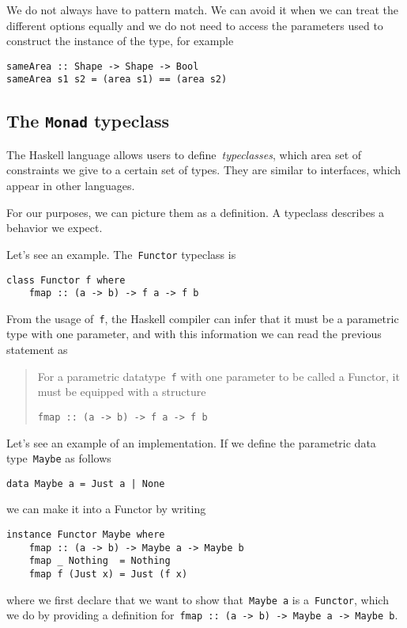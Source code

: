 \documentclass[a4paper]{article}
\theoremstyle{plain}
\theoremstyle{definition}
\begin{document}
We do not always have to pattern match. We can avoid it when we can treat the
different options equally and we do not need to access the parameters used to
construct the instance of the type, for example
\begin{verbatim}
sameArea :: Shape -> Shape -> Bool
sameArea s1 s2 = (area s1) == (area s2)
\end{verbatim}

\subsection{The \texorpdfstring{\texttt{Monad}}{Monad} typeclass}
The Haskell language allows users to define~\emph{typeclasses}, which area set
of constraints we give to a certain set of types.
They are similar to interfaces, which appear in other languages.

For our purposes, we can picture them as a definition. A typeclass describes a
behavior we expect.

Let's see an example. The~\texttt{Functor} typeclass is
\begin{verbatim}
class Functor f where
    fmap :: (a -> b) -> f a -> f b
\end{verbatim}
From the usage of~\texttt{f}, the Haskell compiler can infer
that it must be a parametric type with one parameter, and
with this information we can read the previous statement as
\begin{quote}
    For a parametric datatype~\texttt{f} with one parameter to be
    called a Functor, it must be equipped with a structure

    \texttt{fmap :: (a -> b) -> f a -> f b}
\end{quote}

Let's see an example of an implementation. If we define the parametric data
type~\texttt{Maybe} as follows
\begin{verbatim}
data Maybe a = Just a | None
\end{verbatim}
we can make it into a Functor by writing
\begin{verbatim}
instance Functor Maybe where
    fmap :: (a -> b) -> Maybe a -> Maybe b
    fmap _ Nothing  = Nothing
    fmap f (Just x) = Just (f x)
\end{verbatim}
where we first declare that we want to show that~\texttt{Maybe a}
is a~\texttt{Functor}, which we do by providing a definition
for~\texttt{fmap :: (a -> b) -> Maybe a -> Maybe b}.
\end{document}
